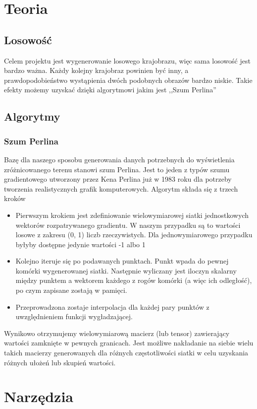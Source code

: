 \documentclass[12pt,a4paper]{article}
\begin{document}
\section{Teoria}
\subsection{Losowość}
Celem projektu jest wygenerowanie losowego krajobrazu, więc sama losowość jest bardzo ważna. Każdy kolejny krajobraz powinien być inny, a prawdopodobieństwo wystąpienia dwóch podobnych obrazów bardzo niskie. Takie efekty możemy uzyskać dzięki algorytmowi jakim jest ,,Szum Perlina''
\subsection{Algorytmy}
\subsubsection{Szum Perlina}
Bazę dla naszego sposobu generowania danych potrzebnych do wyświetlenia zróżnicowanego terenu stanowi szum Perlina. Jest to jeden z typów szumu gradientowego utworzony przez Kena Perlina już w 1983 roku dla potrzeby tworzenia realistycznych grafik komputerowych. 
Algorytm składa się z trzech kroków
\begin{itemize}
\item Pierwszym krokiem jest zdefiniowanie wielowymiarowej siatki jednostkowych wektorów rozpatrywanego gradientu. W naszym przypadku są to wartości losowe z zakresu (0, 1) liczb rzeczywistych. Dla jednowymiarowego przypadku byłyby dostępne jedynie wartości -1 albo 1
\item Kolejno iteruje się po podawanych punktach. Punkt wpada do pewnej komórki wygenerowanej siatki. Następnie wyliczany jest iloczyn skalarny między punktem a wektorem każdego z rogów komórki (a więc ich odległość), po czym zapisane zostają w pamięci.
\item Przeprowadzona zostaje interpolacja dla każdej pary punktów z uwzględnieniem funkcji wygładzającej.
\end{itemize}
Wynikowo otrzymujemy wielowymiarową macierz (lub tensor) zawierający wartości zamknięte w pewnych granicach. Jest możliwe nakładanie na siebie wielu takich macierzy generowanych dla różnych częstotliwości siatki w celu uzyskania różnych ułożeń lub skupień wartości.
\section{Narzędzia}
\end{document}
